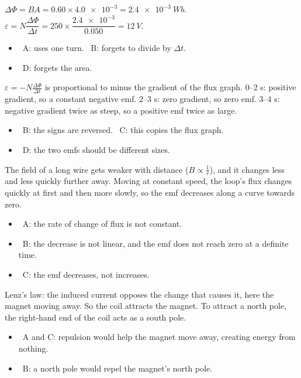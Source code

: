 \documentclass[12pt]{article}
\begin{document}
\begin{practiceanswers}
\begin{practiceans}
  $\Delta\Phi = BA = 0.60 \times \num{4.0e-3} = \qty{2.4e-3}{Wb}$.
  $\varepsilon = N\dfrac{\Delta\Phi}{\Delta t} = 250 \times \dfrac{\num{2.4e-3}}{0.050} = \qty{12}{V}$.
  \begin{itemize}
    \item \xmark\ A: uses one turn. \quad \xmark\ B: forgets to divide by $\Delta t$.
    \item \xmark\ D: forgets the area.
  \end{itemize}
\end{practiceans}

\begin{practiceans}
  $\varepsilon = -N\frac{\Delta\Phi}{\Delta t}$ is proportional to minus the gradient of the flux graph.
  0--2 s: positive gradient, so a constant negative emf. 2--3 s: zero gradient, so zero emf. 3--4 s:
  negative gradient twice as steep, so a positive emf twice as large.
  \begin{itemize}
    \item \xmark\ B: the signs are reversed. \quad \xmark\ C: this copies the flux graph.
    \item \xmark\ D: the two emfs should be different sizes.
  \end{itemize}
\end{practiceans}

\begin{practiceans}
  The field of a long wire gets weaker with distance ($B \propto \frac{1}{r}$), and it changes less and
  less quickly further away. Moving at constant speed, the loop's flux changes quickly at first and then
  more slowly, so the emf decreases along a curve towards zero.
  \begin{itemize}
    \item \xmark\ A: the rate of change of flux is not constant.
    \item \xmark\ B: the decrease is not linear, and the emf does not reach zero at a definite time.
    \item \xmark\ C: the emf decreases, not increases.
  \end{itemize}
\end{practiceans}

\begin{practiceans}
  Lenz's law: the induced current opposes the change that causes it, here the magnet moving away. So the
  coil attracts the magnet. To attract a north pole, the right-hand end of the coil acts as a south pole.
  \begin{itemize}
    \item \xmark\ A and C: repulsion would help the magnet move away, creating energy from nothing.
    \item \xmark\ B: a north pole would repel the magnet's north pole.
  \end{itemize}
\end{practiceans}


\end{practiceanswers}
\end{document}
